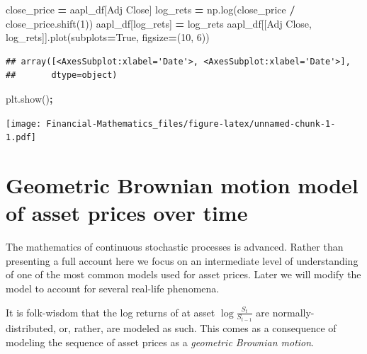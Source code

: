 \documentclass[
]{book}
\newenvironment{Shaded}{\begin{snugshade}}{\end{snugshade}}
\newcommand{\DecValTok}[1]{\textcolor[rgb]{0.00,0.00,0.81}{#1}}
\newcommand{\NormalTok}[1]{#1}
\newcommand{\OperatorTok}[1]{\textcolor[rgb]{0.81,0.36,0.00}{\textbf{#1}}}
\newcommand{\StringTok}[1]{\textcolor[rgb]{0.31,0.60,0.02}{#1}}
\newcommand{\VariableTok}[1]{\textcolor[rgb]{0.00,0.00,0.00}{#1}}
\begin{document}
\begin{Shaded}
\begin{Highlighting}[]
\NormalTok{close\_price }\OperatorTok{=}\NormalTok{ aapl\_df[}\StringTok{\textquotesingle{}Adj Close\textquotesingle{}}\NormalTok{]}
\NormalTok{log\_rets }\OperatorTok{=}\NormalTok{ np.log(close\_price }\OperatorTok{/}\NormalTok{ close\_price.shift(}\DecValTok{1}\NormalTok{))}
\NormalTok{aapl\_df[}\StringTok{\textquotesingle{}log\_rets\textquotesingle{}}\NormalTok{] }\OperatorTok{=}\NormalTok{ log\_rets}
\NormalTok{aapl\_df[[}\StringTok{\textquotesingle{}Adj Close\textquotesingle{}}\NormalTok{, }\StringTok{\textquotesingle{}log\_rets\textquotesingle{}}\NormalTok{]].plot(subplots}\OperatorTok{=}\VariableTok{True}\NormalTok{, figsize}\OperatorTok{=}\NormalTok{(}\DecValTok{10}\NormalTok{, }\DecValTok{6}\NormalTok{))}
\end{Highlighting}
\end{Shaded}

\begin{verbatim}
## array([<AxesSubplot:xlabel='Date'>, <AxesSubplot:xlabel='Date'>],
##       dtype=object)
\end{verbatim}

\begin{Shaded}
\begin{Highlighting}[]
\NormalTok{plt.show()}\OperatorTok{;}
\end{Highlighting}
\end{Shaded}

\texttt{[image: Financial-Mathematics\_files/figure-latex/unnamed-chunk-1-1.pdf]}

\hypertarget{geometric-brownian-motion-model-of-asset-prices-over-time}{%
\section{Geometric Brownian motion model of asset prices over time}\label{geometric-brownian-motion-model-of-asset-prices-over-time}}

The mathematics of continuous stochastic processes is advanced. Rather than presenting a full account here we focus on an intermediate level of understanding of one of the most common models used for asset prices. Later we will modify the model to account for several real-life phenomena.

It is folk-wisdom that the log returns of at asset \(\log\frac{S_t}{S_{t-1}}\) are normally-distributed, or, rather, are modeled as such. This comes as a consequence of modeling the sequence of asset prices as a \emph{geometric Brownian motion}.
\end{document}
